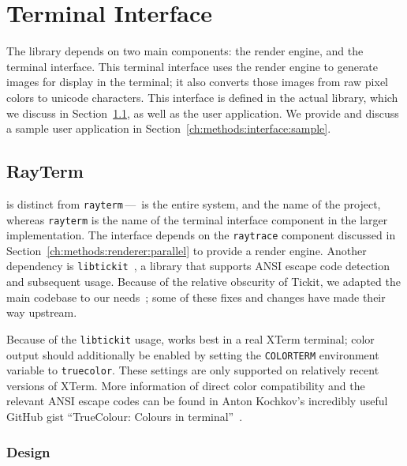\section{Terminal Interface}
\label{ch:methods:interface}

The \name{} library depends on two main components: the render engine, and the terminal interface.
This terminal interface uses the render engine to generate images for display in the terminal; it also converts those images from raw pixel colors to unicode characters.
This interface is defined in the actual library, which we discuss in Section~\ref{ch:methods:interface:rayterm}, as well as the user application.
We provide and discuss a sample user application in Section~\ref{ch:methods:interface:sample}.

\subsection{RayTerm}
\label{ch:methods:interface:rayterm}

 \name{} is distinct from \texttt{rayterm}\,---\,\name{} is the entire system, and the name of the project, whereas \texttt{rayterm} is the name of the terminal interface component in the larger implementation.
The interface depends on the \texttt{raytrace} component discussed in Section~\ref{ch:methods:renderer:parallel} to provide a render engine.
Another dependency is \texttt{libtickit}~\cite{libtickitLibrary}, a library that supports ANSI escape code detection and subsequent usage.
Because of the relative obscurity of Tickit, we adapted the main codebase to our needs~\cite{libtickitCustom}; some of these fixes and changes have made their way upstream.

Because of the \texttt{libtickit} usage, \name{} works best in a real XTerm terminal; color output should additionally be enabled by setting the \texttt{COLORTERM} environment variable to \texttt{truecolor}.
These settings are only supported on relatively recent versions of XTerm.
More information of direct color compatibility and the relevant ANSI escape codes can be found in Anton Kochkov's incredibly useful GitHub gist ``TrueColour: Colours in terminal''~\cite{kochkov2019colours}.

\subsubsection{Design}
\label{ch:methods:interface:tickit:design}

